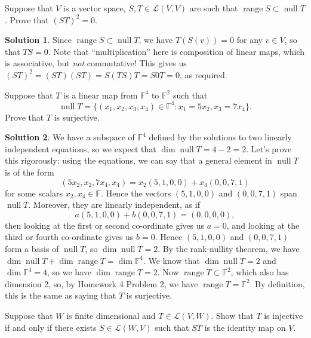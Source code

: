 \documentclass[12pt]{article}
\theoremstyle{definition}
\theoremstyle{definition}
\newtheorem*{soln}{Solution}
\newcommand{\F}{\mathbb{F}}
\newcommand{\Null}{\operatorname{null}}
\newcommand{\range}{\operatorname{range}}
\begin{document}
\begin{prob}[Axler 3.B.2]
Suppose that $V$ is a vector space, $S,T\in\mathcal{L}(V,V)$ are such that $\operatorname{range}S\subset \operatorname{null} T$. Prove that $(ST)^2=0$.
\end{prob}

\begin{soln}
Since $\operatorname{range}S\subset \operatorname{null} T$, we have $T(S(v))=0$ for any $v\in V$, so that $TS=0$. Note that ``multiplication'' here is composition of linear maps, which is associative, but \emph{not} commutative! This gives us $(ST)^2=(ST)(ST)=S(TS)T=S0T=0$, as required.
\end{soln}


\begin{prob}[Axler 3.B.13]
Suppose that $T$ is a linear map from $\F^4$ to $\F^2$ such that 
\[\Null T=\{(x_1,x_2,x_3,x_4)\in\F^4:x_1=5x_2,x_3=7x_4\}.\]
Prove that $T$ is surjective.
\end{prob}

\begin{soln}
We have a subspace of $\F^4$ defined by the solutions to two linearly independent equations, so we expect that $\dim\Null T=4-2=2$. Let's prove this rigorously: using the equations, we can say that a general element in $\Null T$ is of the form
\[(5x_2,x_2,7x_4,x_4)=x_2(5,1,0,0)+x_4(0,0,7,1)\]
for some scalars $x_2,x_4\in\F$. Hence the vectors $(5,1,0,0)$ and $(0,0,7,1)$ span $\Null T$. Moreover, they are linearly independent, as if
\[a(5,1,0,0)+b(0,0,7,1)=(0,0,0,0),\]
then looking at the first or second co-ordinate gives us $a=0$, and looking at the third or fourth co-ordinate gives us $b=0$. Hence $(5,1,0,0)$ and $(0,0,7,1)$ form a basis of $\Null T$, so $\dim \Null T=2$. By the rank-nullity theorem, we have $\dim\Null T+\dim\range T=\dim \F^4$. We know that $\dim \Null T=2$ and $\dim \F^4=4$, so we have $\dim \range T=2$. Now $\range T\subset \F^2$, which also has dimension 2, so, by Homework 4 Problem 2, we have $\range T=\F^2$. By definition, this is the same as saying that $T$ is surjective.
\end{soln}

\begin{prob}[Axler 3.B.20]
Suppose that $W$ is finite dimensional and $T\in\mathcal{L}(V,W)$. Show that $T$ is injective if and only if there exists $S\in\mathcal{L}(W,V)$ such that $ST$ is the identity map on $V$.
\end{prob}
\end{document}
